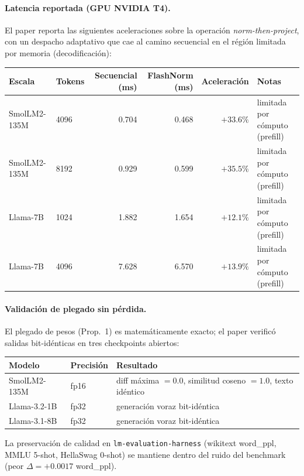\paragraph{Latencia reportada (GPU NVIDIA T4).}
El paper reporta las siguientes aceleraciones sobre la operación \emph{norm-then-project}, con un despacho adaptativo que cae al camino secuencial en el régión limitada por memoria (decodificación):

\scriptsize
\begin{tabular}{llrrrl}
\toprule
\textbf{Escala} & \textbf{Tokens} & \textbf{Secuencial (ms)} & \textbf{FlashNorm (ms)} & \textbf{Aceleración} & \textbf{Notas} \\
\midrule
SmolLM2-135M & 4096 & 0.704 & 0.468 & $+33.6\%$ & limitada por cómputo (prefill) \\
SmolLM2-135M & 8192 & 0.929 & 0.599 & $+35.5\%$ & limitada por cómputo (prefill) \\
Llama-7B     & 1024 & 1.882 & 1.654 & $+12.1\%$ & limitada por cómputo (prefill) \\
Llama-7B     & 4096 & 7.628 & 6.570 & $+13.9\%$ & limitada por cómputo (prefill) \\
\bottomrule
\end{tabular}
\normalsize

\paragraph{Validación de plegado sin pérdida.}
El plegado de pesos (Prop.~1) es matemáticamente exacto; el paper verificó salidas bit-idénticas en tres checkpoints abiertos:

\scriptsize
\begin{tabular}{lll}
\toprule
\textbf{Modelo} & \textbf{Precisión} & \textbf{Resultado} \\
\midrule
SmolLM2-135M & fp16 & diff máxima $=0.0$, similitud coseno $=1.0$, texto idéntico \\
Llama-3.2-1B & fp32 & generación voraz bit-idéntica \\
Llama-3.1-8B & fp32 & generación voraz bit-idéntica \\
\bottomrule
\end{tabular}
\normalsize
La preservación de calidad en \texttt{lm-evaluation-harness} (wikitext word\_ppl, MMLU 5-shot, HellaSwag 0-shot) se mantiene dentro del ruido del benchmark (peor $\Delta=+0.0017$ word\_ppl).

